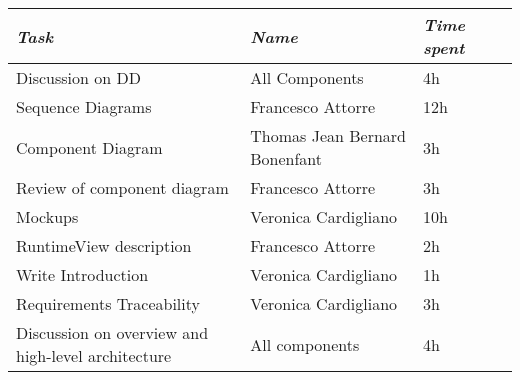 \begin{table}[H]
\centering
\begin{tabular}{|l|l|l|l|}
\hline
\textit{\textbf{Task}} & \textit{\textbf{Name}}        & \textit{\textbf{Time spent}}                                                                                                                                                                                                                                                                   \\ \hline
Discussion on DD &All Components &4h
\\ \hline
Sequence Diagrams & Francesco Attorre    & 12h
\\ \hline
Component Diagram & Thomas Jean Bernard Bonenfant & 3h  
\\ \hline
Review of component diagram & Francesco Attorre  & 3h   
\\ \hline                                                                                                                                                                                                                                                                                     
Mockups & Veronica Cardigliano          & 10h                                                                                                                                                                                                                                                                                \\ \hline
RuntimeView description & Francesco Attorre             & 2h                                                                                                                                                                                                                                                                                 \\ \hline
Write Introduction  & Veronica Cardigliano          & 1h                                                                                                                                                                                                                                                                                    \\ \hline
Requirements Traceability & Veronica Cardigliano  & 3h  
\\ \hline
Discussion on overview and high-level architecture & All components & 4h                                                                                                                                                                                                                                                                           

\end{tabular}
\end{table}
